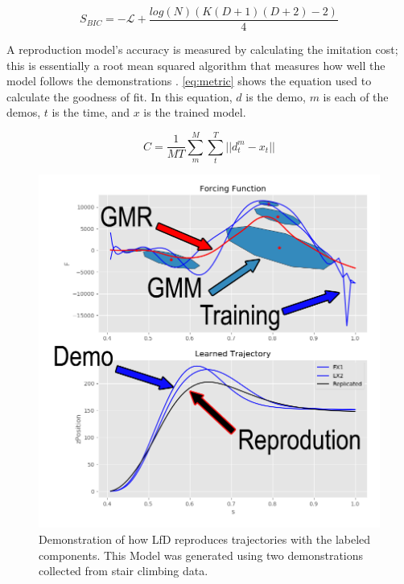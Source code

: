 \begin{equation} 
    S_{BIC} = -\mathcal{L} + \frac{log(N)(K(D+1)(D+2)-2)}{4}  
    \label{eq:BIC} 
\end{equation} 


A reproduction model's accuracy is measured by calculating the imitation cost; this is essentially a root mean squared algorithm that measures how well the model follows the demonstrations \cite{metric}. \autoref{eq:metric} shows the equation used to calculate the goodness of fit. In this equation, $d$ is the demo, $m$ is each of the demos, $t$ is the time, and $x$ is the trained model. 

\begin{equation}
    C = \frac{1}{MT} \sum_m^M{\sum_t^T{ || d^m_t - x_t||}}
    \label{eq:metric}
\end{equation}


 \begin{figure}
     \centering
     \includegraphics[scale=0.42]{images/background/GMM_reproduction.png}
     \caption[Simple Reproduction Example]{Demonstration of how LfD reproduces trajectories with the labeled components. This Model was generated using two demonstrations collected from stair climbing data. }
     \label{fig:SimpleGMMExample}
 \end{figure}

